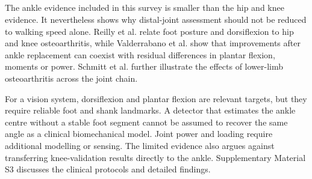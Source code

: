 \documentclass[12pt,nopreprintline]{elsarticle}
\begin{document}
\subsection{}
\label{sec:ankle_synthesis}
\begin{revision}
The ankle evidence included in this survey is smaller than the hip and knee evidence. It nevertheless shows why distal-joint assessment should not be reduced to walking speed alone. Reilly et al. \cite{reilly2009role} relate foot posture and dorsiflexion to hip and knee osteoarthritis, while Valderrabano et al. \cite{valderrabano2007gait} show that improvements after ankle replacement can coexist with residual differences in plantar flexion, moments or power. Schmitt et al. \cite{schmitt2015effect} further illustrate the effects of lower-limb osteoarthritis across the joint chain.

For a vision system, dorsiflexion and plantar flexion are relevant targets, but they require reliable foot and shank landmarks. A detector that estimates the ankle centre without a stable foot segment cannot be assumed to recover the same angle as a clinical biomechanical model. Joint power and loading require additional modelling or sensing. The limited evidence also argues against transferring knee-validation results directly to the ankle. Supplementary Material S3 discusses the clinical protocols and detailed findings.
\end{revision}
\end{document}
